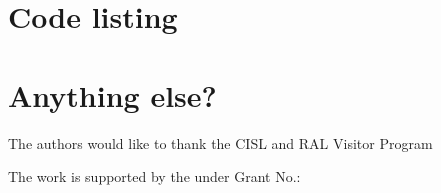 




%




\appendix
\section{Code listing}
\section{Anything else?}

\begin{acks}
  The authors would like to thank the CISL and RAL Visitor Program

  The work is
  supported by the  under Grant
  No.:~

\end{acks}
